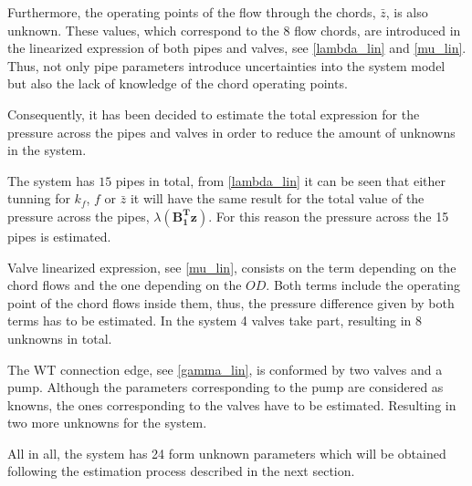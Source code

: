 %


Furthermore, the operating points of the flow through the chords, $\bar{z}$, is also unknown. These values, which correspond to the $8$ flow chords, are introduced in the linearized expression of both pipes 
and valves, see \eqref{lambda_lin} and \eqref{mu_lin}. Thus, not only pipe parameters introduce uncertainties into the system model but also the lack of knowledge of the chord operating points.

Consequently, it has been decided to estimate the total expression for the pressure across the pipes and valves in order to reduce the amount of unknowns in the system.

The system has $15$ pipes in total,  from \eqref{lambda_lin} it can be seen that either tunning for $k_f$, $f$ or $\bar{z}$ it will have the same result for the total
value of the pressure across the pipes, $\lambda(\pmb{{B_1^{T}}}\pmb{z})$. For this reason the pressure across the 15 pipes is estimated.

Valve linearized expression, see \eqref{mu_lin}, consists on the term depending on the chord flows and the one depending on the $OD$. Both terms include the operating 
point of the chord flows inside them, thus, the pressure difference given by both terms has to be estimated. In the system 4 valves take part, 
resulting in 8 unknowns in total. 

The WT connection edge, see \eqref{gamma_lin}, is conformed by two valves and a pump. Although the parameters corresponding to the pump are considered as knowns, the ones 
corresponding to the valves have to be estimated. Resulting in two more unknowns for the system. 

All in all, the system has 24 form unknown parameters which will be obtained following the estimation process described in the next section.